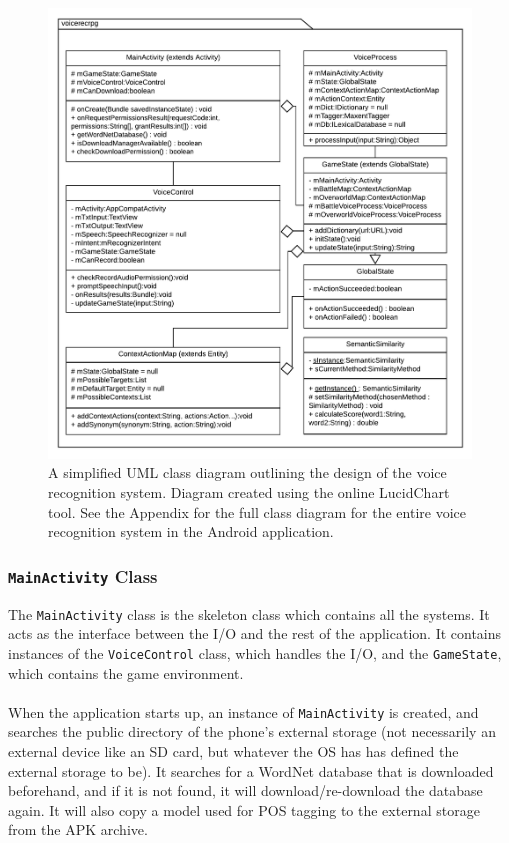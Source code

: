 \documentclass[12pt]{article}
\begin{document}
\begin{center}
\begin{figure}[H]
\begin{center}
  \includegraphics[width=\linewidth]{system-overview.pdf}
  \caption{A simplified UML class diagram outlining the design of the voice recognition system. Diagram created using the online LucidChart tool. See the Appendix for the full class diagram for the entire voice recognition system in the Android application.}
  \label{fig:system-overview}
  \end{center}
\end{figure}
\end{center}

\subsubsection{\texttt{MainActivity} Class}

The \texttt{MainActivity} class is the skeleton class which contains all the systems. It acts as the interface between the I/O and the rest of the application. It contains instances of the \texttt{VoiceControl} class, which handles the I/O, and the \texttt{GameState}, which contains the game environment.
\\
\\
When the application starts up, an instance of \texttt{MainActivity} is created, and searches the public directory of the phone's external storage (not necessarily an external device like an SD card, but whatever the OS has has defined the external storage to be). It searches for a WordNet database that is downloaded beforehand, and if it is not found, it will download/re-download the database again. It will also copy a model used for POS tagging to the external storage from the APK archive.
\end{document}
